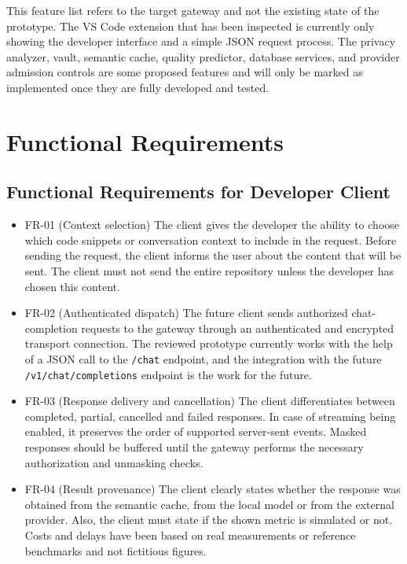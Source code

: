 \documentclass{FastFyp}
\begin{document}
This feature list refers to the target gateway and not the existing state of
the prototype. The VS Code extension that has been inspected is currently only
showing the developer interface and a simple JSON request process. The privacy
analyzer, vault, semantic cache, quality predictor, database services, and
provider admission controls are some proposed features and will only be marked
as implemented once they are fully developed and tested.

\section{Functional Requirements}
\label{sec:functional-reqs}
\subsection{Functional Requirements for Developer Client}
\begin{itemize}
\item FR-01 (Context selection)
The client gives the developer the ability to choose which code snippets or conversation context to include in the request. Before sending the request, the client informs the user about the content that will be sent. The client must not send the entire repository unless the developer has chosen this content.
\item FR-02 (Authenticated dispatch)
The future client sends authorized chat-completion requests to the gateway through an authenticated and encrypted transport connection. The reviewed prototype currently works with the help of a JSON call to the \texttt{/chat} endpoint, and the integration with the future \texttt{/v1/chat/completions} endpoint is the work for the future.
\item FR-03 (Response delivery and cancellation)
The client differentiates between completed, partial, cancelled and failed responses. In case of streaming being enabled, it preserves the order of supported server-sent events. Masked responses should be buffered until the gateway performs the necessary authorization and unmasking checks.
\item FR-04 (Result provenance)
The client clearly states whether the response was obtained from the semantic cache, from the local model or from the external provider. Also, the client must state if the shown metric is simulated or not. Costs and delays have been based on real measurements or reference benchmarks and not fictitious figures.
\end{itemize}
\end{document}
